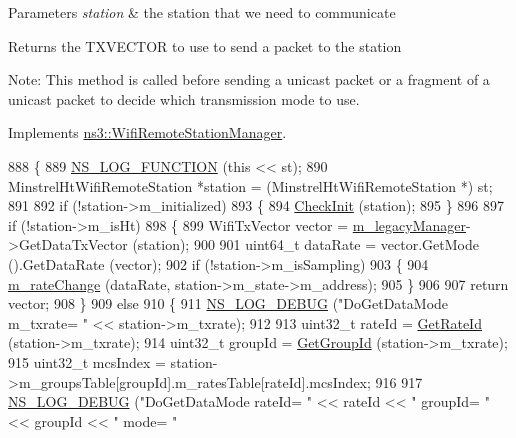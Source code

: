 \begin{DoxyParams}{Parameters}
{\em station} & the station that we need to communicate\\
\hline
\end{DoxyParams}
\begin{DoxyReturn}{Returns}
the T\+X\+V\+E\+C\+T\+OR to use to send a packet to the station
\end{DoxyReturn}
Note\+: This method is called before sending a unicast packet or a fragment of a unicast packet to decide which transmission mode to use. 

Implements \hyperlink{classns3_1_1WifiRemoteStationManager_a5a6b2bfcd4959da43c54f0072bd01202}{ns3\+::\+Wifi\+Remote\+Station\+Manager}.


\begin{DoxyCode}
888 \{
889   \hyperlink{log-macros-disabled_8h_a90b90d5bad1f39cb1b64923ea94c0761}{NS\_LOG\_FUNCTION} (\textcolor{keyword}{this} << st);
890   MinstrelHtWifiRemoteStation *station = (MinstrelHtWifiRemoteStation *) st;
891 
892   \textcolor{keywordflow}{if} (!station->m\_initialized)
893     \{
894       \hyperlink{classns3_1_1MinstrelHtWifiManager_a7f94804a34efa6121bdfd5d01ac34694}{CheckInit} (station);
895     \}
896 
897   \textcolor{keywordflow}{if} (!station->m\_isHt)
898     \{
899       WifiTxVector vector = \hyperlink{classns3_1_1MinstrelHtWifiManager_ae10ffd948e46a60593b1aef80372082a}{m\_legacyManager}->GetDataTxVector (station);
900 
901       uint64\_t dataRate = vector.GetMode ().GetDataRate (vector);
902       \textcolor{keywordflow}{if} (!station->m\_isSampling)
903         \{
904           \hyperlink{classns3_1_1MinstrelHtWifiManager_a40f1adcf50b778a96c87e16db15e950f}{m\_rateChange} (dataRate, station->m\_state->m\_address);
905         \}
906 
907       \textcolor{keywordflow}{return} vector;
908     \}
909   \textcolor{keywordflow}{else}
910     \{
911       \hyperlink{group__logging_ga413f1886406d49f59a6a0a89b77b4d0a}{NS\_LOG\_DEBUG} (\textcolor{stringliteral}{"DoGetDataMode m\_txrate= "} << station->m\_txrate);
912 
913       uint32\_t rateId = \hyperlink{classns3_1_1MinstrelHtWifiManager_a6162341f1348bbe713d09642b09ac658}{GetRateId} (station->m\_txrate);
914       uint32\_t groupId = \hyperlink{classns3_1_1MinstrelHtWifiManager_a43157e6007b4b922043cb02a99ea6d1f}{GetGroupId} (station->m\_txrate);
915       uint32\_t mcsIndex = station->m\_groupsTable[groupId].m\_ratesTable[rateId].mcsIndex;
916 
917       \hyperlink{group__logging_ga413f1886406d49f59a6a0a89b77b4d0a}{NS\_LOG\_DEBUG} (\textcolor{stringliteral}{"DoGetDataMode rateId= "} << rateId << \textcolor{stringliteral}{" groupId= "} << groupId << \textcolor{stringliteral}{" mode= "} 

\end{DoxyCode}
